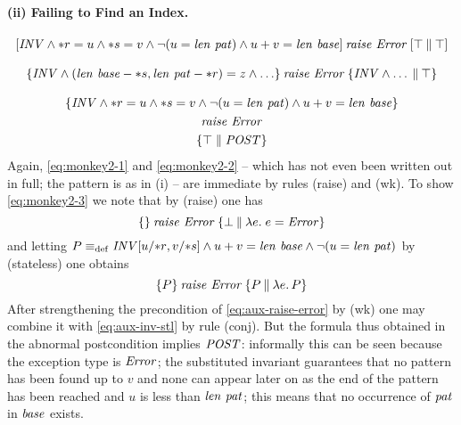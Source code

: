 \paragraph{(ii) Failing to Find an Index.}
\begin{gather}
\label{eq:monkey2-1}
[\mathit{INV} \land {\ast r} = u \land {\ast s} = v \land \lnot(u = \mathit{len}~\mathit{pat})
\land u+v = \mathit{len}~\mathit{base}]\:\mathit{raise}~\mathit{Error}\:[\top\:\|\:\top]\\[2ex]
\label{eq:monkey2-2}
\{\mathit{INV} \land (\mathit{len}~\mathit{base} - {\ast s}, \mathit{len}~\mathit{pat} - {\ast r}) = z
  \land \ldots\}\: \mathit{raise}~\mathit{Error}\:\{\mathit{INV} \land \ldots\:\|\:\top\}\\[2ex] \nonumber
\{\mathit{INV} \land {\ast r} = u \land {\ast s} = v \land 
 \lnot (u = \mathit{len}~\mathit{pat}) \land u+v = \mathit{len}~\mathit{base}\}\\
\label{eq:monkey2-3}
{\mathit{raise}~\mathit{Error}}\\\nonumber
\{\top \parallel \mathit{POST}\}
\end{gather}
Again, \eqref{eq:monkey2-1} and \eqref{eq:monkey2-2} -- which has not even been
written out in full; the pattern is as in (i) -- are immediate by rules
(raise) and (wk). To show \eqref{eq:monkey2-3} we note that by (raise) one has 
\begin{equation}
\label{eq:aux-raise-error}
\{\}\:\mathit{raise}~\mathit{Error}\:\{\bot\:\|\:\lambda e.\; e = \mathit{Error}\}
\end{equation}
and letting $P \equiv_{\mathrm{def}} \mathit{INV}[u/ {\ast r}, v/ {\ast s}] \land u + v =
\mathit{len}~\mathit{base} \land \lnot(u = \mathit{len}~\mathit{pat})$ by (stateless) one obtains
\begin{equation}\label{eq:aux-inv-stl}
\{P\}\:\mathit{raise}~\mathit{Error}\:\{P\:\|\:\lambda e.\, P\}
\end{equation}
After strengthening the precondition of \eqref{eq:aux-raise-error} by (wk) one
may combine it with \eqref{eq:aux-inv-stl} by rule (conj). But the formula thus
obtained in the abnormal postcondition implies $\mathit{POST}$: informally this can
be seen because the exception type is $\mathit{Error}$; the substituted invariant
guarantees that no pattern has been found up to $v$ and none can appear later on
as the end of the pattern has been reached and $u$ is less than
$\mathit{len}~\mathit{pat}$; this means that no occurrence of $\mathit{pat}$ in $\mathit{base}$
exists. 

